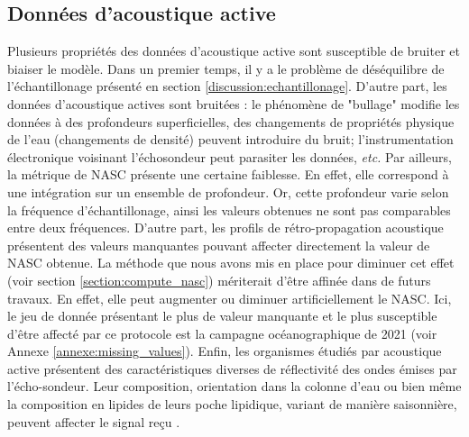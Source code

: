 \documentclass[11pt,a4paper,oneside]{report}
\begin{document}
	\subsection{Données d'acoustique active}
	Plusieurs propriétés des données d'acoustique active sont susceptible de bruiter et biaiser le modèle. Dans un premier temps, il y a le problème de déséquilibre de l'échantillonage présenté en section \ref{discussion:echantillonage}. D'autre part, les données d'acoustique actives sont bruitées : le phénomène de "bullage" modifie les données à des profondeurs superficielles, des changements de propriétés physique de l'eau (changements de densité) peuvent introduire du bruit; l'instrumentation électronique voisinant l'échosondeur peut parasiter les données, \textit{etc.}
	Par ailleurs, la métrique de NASC présente une certaine faiblesse. En effet, elle correspond à une intégration sur un ensemble de profondeur. Or, cette profondeur varie selon la fréquence d'échantillonage, ainsi les valeurs obtenues ne sont pas comparables entre deux fréquences. D'autre part, les profils de rétro-propagation acoustique présentent des valeurs manquantes pouvant affecter directement la valeur de NASC obtenue. La méthode que nous avons mis en place pour diminuer cet effet (voir section \ref{section:compute_nasc}) mériterait d'être affinée dans de futurs travaux. En effet, elle peut augmenter ou diminuer artificiellement le NASC. Ici, le jeu de donnée présentant le plus de valeur manquante et le plus susceptible d'être affecté par ce protocole est la campagne océanographique de 2021 (voir Annexe \ref{annexe:missing_values}).
	Enfin, les organismes étudiés par acoustique active présentent des caractéristiques diverses de réflectivité des ondes émises par l'écho-sondeur. Leur composition, orientation dans la colonne d'eau ou bien même la composition en lipides de leurs poche lipidique, variant de manière saisonnière, peuvent affecter le signal reçu \cite{benoitbird2016ecological}. 
	
\end{document}
